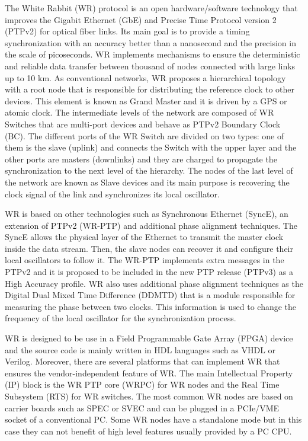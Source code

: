 \documentclass[review]{elsarticle}
\begin{document}
The White Rabbit (WR) protocol is an open hardware/software technology that improves the Gigabit Ethernet (GbE) and Precise Time Protocol version 2 (PTPv2) for optical fiber links. Its main goal is to provide a timing synchronization with an accuracy better than a nanosecond and the precision in the scale of picoseconds. WR implements mechanisms to ensure the deterministic and reliable data transfer between thousand of nodes connected with large links up to 10 km. As conventional networks, WR proposes a hierarchical topology with a root node that is responsible for distributing the reference clock to other devices. This element is known as Grand Master and it is driven by a GPS or atomic clock. The intermediate levels of the network are composed of WR Switches that are multi-port devices and behave as PTPv2 Boundary Clock (BC). The different ports of the WR Switch are divided on two types: one of them is the slave (uplink) and connects the Switch with the upper layer and the other ports are masters (downlinks) and they are charged to propagate the synchronization to the next level of the hierarchy. The nodes of the last level of the network are known as Slave devices and its main purpose is recovering the clock signal of the link and synchronizes its local oscillator.


WR is based on other technologies such as Synchronous Ethernet (SyncE), an extension of PTPv2 (WR-PTP) and additional phase alignment techniques. The SyncE allows the physical layer of the Ethernet to transmit the master clock inside the data stream. Then, the slave nodes can recover it and configure their local oscillators to follow it. The WR-PTP implements extra messages in the PTPv2 and it is proposed to be included in the new PTP release (PTPv3) as a High Accuracy profile. WR also uses additional phase alignment techniques as the Digital Dual Mixed Time Difference (DDMTD) that is a module responsible for measuring the phase between two clocks. This information is used to change the frequency of the local oscillator for the synchronization process.

WR is designed to be use in a Field Programmable Gate Array (FPGA) device and the source code is mainly written in HDL languages such as VHDL or Verilog. Moreover, there are several platforms that can implement WR that ensures the vendor-independent feature of WR. The main Intellectual Property (IP) block is the WR PTP core (WRPC) for WR nodes and the Real Time Subsystem (RTS) for WR switches. The most common WR nodes are based on carrier boards such as SPEC or SVEC and can be plugged in a PCIe/VME socket of a conventional PC. Some WR nodes have a standalone mode but in this case they can not benefit of high level features usually provided by a PC CPU.
\end{document}
